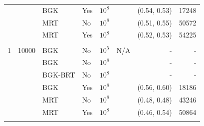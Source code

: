 \documentclass[pdftex,ms]{pittetd}
\begin{document}
\begin{table}
\begin{tabulary}{\linewidth}{r r l l r r r r}
  &      & BGK     & Yes & $10^8$ &              & (0.54, 0.53) & 17248 \\
  &      & MRT     & No  & $10^8$ &              & (0.51, 0.55) & 50572 \\
  &      & MRT     & Yes & $10^8$ &              & (0.52, 0.53) & 54225 \\
\\
1 & 10000 & BGK     & No  & $10^5$ & N/A          & - & - \\
  &       & BGK     & No  & $10^8$ &              & - & - \\
  &       & BGK-BRT & No  & $10^8$ &              & - & - \\
  &       & BGK     & Yes & $10^8$ &              & (0.56, 0.60) & 18186 \\
  &       & MRT     & No  & $10^8$ &              & (0.48, 0.48) & 43246 \\
  &       & MRT     & Yes & $10^8$ &              & (0.46, 0.54) & 50864 \\
\\
\end{tabulary}
\label{tab:lid-bing1}
\end{table}
\end{document}
